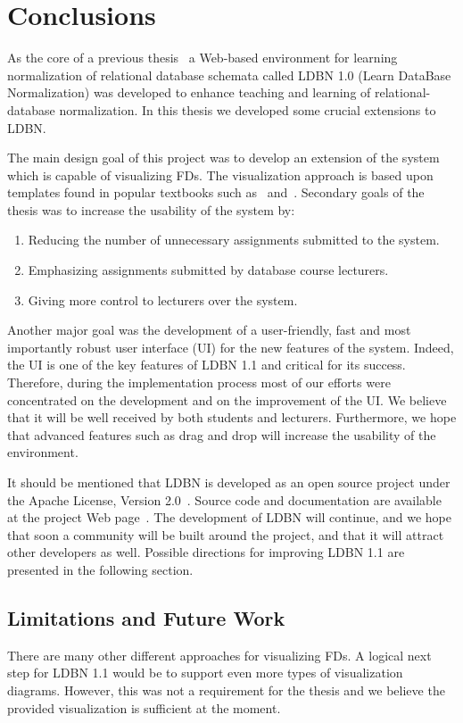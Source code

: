 \chapter{Conclusions}
\label{chap:conclusion}
As the core of a previous thesis~\cite{mt1}
a Web-based environment for learning normalization of relational database schemata
called LDBN 1.0 (Learn DataBase Normalization) was developed to
enhance teaching and learning of relational-database normalization. 
In this thesis we developed some crucial extensions to LDBN.

The main design goal of this project was to develop an extension of the system which is capable of 
visualizing FDs. The visualization approach is based
upon templates found in popular textbooks such as~\cite{bdb1} and~\cite{bdb2}. Secondary goals of the
thesis was to increase the usability of the system by: 

\begin{enumerate}
	\item Reducing the number of unnecessary assignments
	submitted to the system.
	\item Emphasizing assignments submitted by database course lecturers.
	\item Giving more control to lecturers over the system.
\end{enumerate}

Another major goal was the
development of a user-friendly, fast and most importantly robust
user interface (UI) for the new features of the system. 
Indeed, the UI is one of the key features of LDBN 1.1 and critical for its
success. Therefore, during the implementation process 
most of our efforts were concentrated on the development and on the improvement of the UI. 
We believe that it will be well received by both students and lecturers.
Furthermore, we hope that advanced features such as drag and drop will 
increase the usability of the environment.

It should be mentioned that LDBN is developed as an open source project 
under the Apache License, Version 2.0~\cite{walv20}. 
Source code and documentation are available at the project Web page~\cite{wldbnpp}. 
The development of LDBN will continue, and we
hope that soon a community will be
built around the project, and that it will attract other developers as well. 
Possible directions for improving LDBN 1.1 are presented in the following section. 

\section{Limitations and Future Work}
There are many other different approaches for visualizing FDs.
A logical next step for LDBN 1.1 would be to support
even more types of visualization diagrams. 
However, this was not a requirement for the thesis and we believe the provided 
visualization is sufficient at the moment. 

